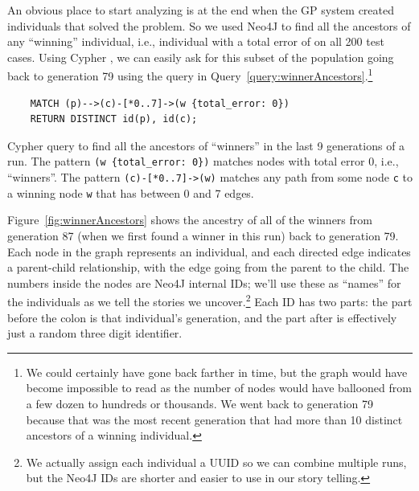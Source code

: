 An obvious place to start analyzing is at the end when the GP system created individuals that solved the problem. So we used Neo4J to find all the ancestors of any ``winning'' individual, i.e., individual with a total error of 
on all 200 test cases. Using Cypher%
, we can easily ask for this subset
of the population going back to generation 79 using the query in 
Query~\ref{query:winnerAncestors}.\footnote{We could certainly 
	have gone back farther in time, but the graph would have become impossible to read as the
	number of nodes would have ballooned from a few dozen to hundreds or thousands. We went
	back to generation 79 because that was the most recent generation that had more than 10
	distinct ancestors of a winning individual.}

\begin{Query}
	\smallskip
	\begin{verbatim}
	MATCH (p)-->(c)-[*0..7]->(w {total_error: 0}) 
	RETURN DISTINCT id(p), id(c);
	\end{verbatim}
	\caption{Cypher query to find all the ancestors of ``winners'' in the last 9 generations of a run.
		The pattern \texttt{(w \{total\_error: 0\})} matches nodes with total error 0, i.e., 
		``winners''. The pattern \texttt{(c)-[*0..7]->(w)} matches any path from some node \texttt{c} to
		a winning node \texttt{w} that has between 0 and 7 edges.
		}
	\label{query:winnerAncestors}
\end{Query}

Figure~\ref{fig:winnerAncestors} shows the ancestry of all of the winners from generation 87 
(when we first found a winner in this run) back to generation 79.
Each node in the graph represents an individual, and each directed edge indicates a parent-child
relationship, with the edge going from the parent to the child. The numbers inside the nodes are
Neo4J internal IDs; we'll use these as ``names'' for the individuals as we tell the stories 
we uncover.\footnote{We actually assign each individual a UUID so we can combine multiple runs, but
	the Neo4J IDs are shorter and easier to use in our story telling.} Each ID has two parts:
the part before the colon is that individual's generation, and the part after is effectively
just a random three digit identifier.

